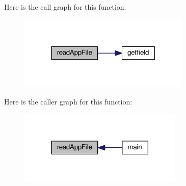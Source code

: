 Here is the call graph for this function\-:\nopagebreak
\begin{figure}[H]
\begin{center}
\leavevmode
\includegraphics[width=232pt]{read__app__file_8hh_aa73d7abbbef707bf918fbef4c1942cae_cgraph}
\end{center}
\end{figure}




Here is the caller graph for this function\-:\nopagebreak
\begin{figure}[H]
\begin{center}
\leavevmode
\includegraphics[width=222pt]{read__app__file_8hh_aa73d7abbbef707bf918fbef4c1942cae_icgraph}
\end{center}
\end{figure}




